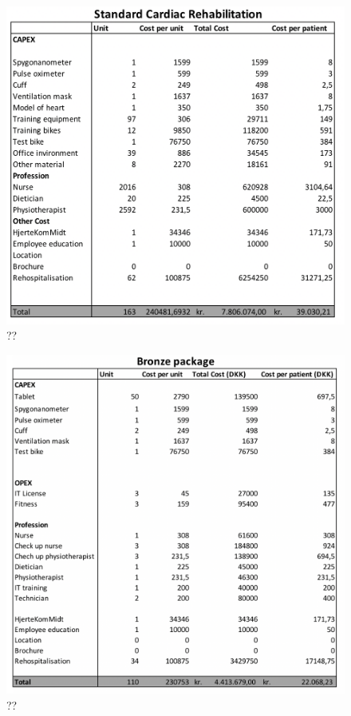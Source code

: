 \begin{figure}[H]
\centering
\includegraphics[width=1\textwidth]{Figure/SCR.png}
\caption{??}
\label{fig: SCR}
\end{figure} 
\begin{figure}[H]
\centering
\includegraphics[width=1\textwidth]{Figure/Bronze.png}
\caption{??}
\label{fig: bronze}
\end{figure} 

